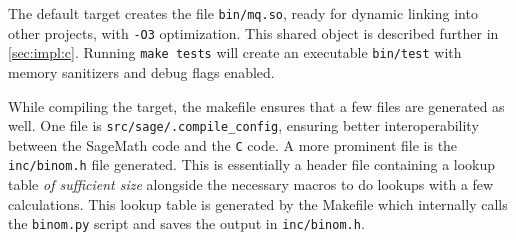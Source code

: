 The default target creates the file \texttt{bin/mq.so}, ready for dynamic linking into other projects, with \texttt{-O3} optimization. This shared object is described further in \cref{sec:impl:c}. Running \texttt{make tests} will create an executable \texttt{bin/test} with memory sanitizers and debug flags enabled. 

While compiling the target, the makefile ensures that a few files are generated as well. One file is \texttt{src/sage/.compile\_config}, ensuring better interoperability between the SageMath code and the \texttt{C} code. A more prominent file is the \texttt{inc/binom.h} file generated. This is essentially a header file containing a lookup table \textit{of sufficient size} alongside the necessary macros to do lookups with a few calculations. This lookup table is generated by the Makefile which internally calls the \texttt{binom.py} script and saves the output in \texttt{inc/binom.h}.

\newpage